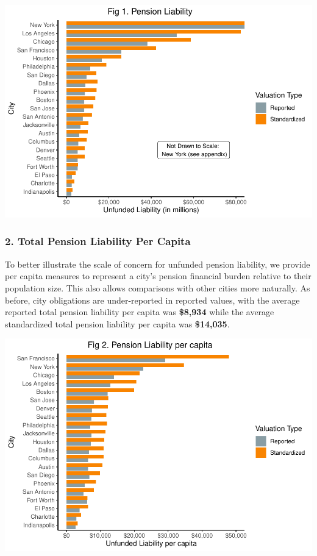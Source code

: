 \documentclass[
]{article}
\begin{document}
\includegraphics{City-Solvency-Report--Adjusted-_files/figure-latex/unnamed-chunk-6-1.pdf}

\hypertarget{total-pension-liability-per-capita}{%
\subsubsection{2. Total Pension Liability Per
Capita}\label{total-pension-liability-per-capita}}

To better illustrate the scale of concern for unfunded pension
liability, we provide per capita measures to represent a city's pension
financial burden relative to their population size. This also allows
comparisons with other cities more naturally. As before, city
obligations are under-reported in reported values, with the average
reported total pension liability per capita was \textbf{\$8,934} while
the average standardized total pension liability per capita was
\textbf{\$14,035}.

\includegraphics{City-Solvency-Report--Adjusted-_files/figure-latex/unnamed-chunk-7-1.pdf}
\end{document}
